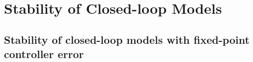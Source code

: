 \documentclass[twocolumn]{autart}    %
\begin{document}


\appendix


\section{Stability of Closed-loop Models}
\label{sec:appendix-stability}

\subsection{Stability of closed-loop models with fixed-point controller error}
\label{sec:stab_FWL}
\end{document}
